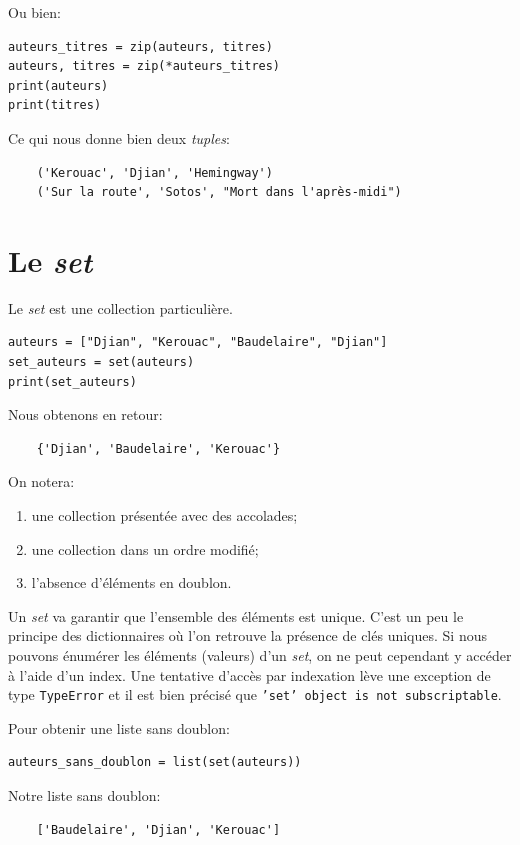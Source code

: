 \documentclass[a4paper,12pt]{book}
\begin{document}
Ou bien:
\begin{lstlisting}
auteurs_titres = zip(auteurs, titres)
auteurs, titres = zip(*auteurs_titres)
print(auteurs)
print(titres)
\end{lstlisting}
\medskip

Ce qui nous donne bien deux \textit{tuples}:
\begin{verbatim}
    ('Kerouac', 'Djian', 'Hemingway')
    ('Sur la route', 'Sotos', "Mort dans l'après-midi")
\end{verbatim}
\medskip

\section{Le \textit{set}}
Le \textit{set} est une collection particulière.
\begin{lstlisting}
auteurs = ["Djian", "Kerouac", "Baudelaire", "Djian"]
set_auteurs = set(auteurs)
print(set_auteurs)
\end{lstlisting}
\medskip

Nous obtenons en retour:
\begin{verbatim}
    {'Djian', 'Baudelaire', 'Kerouac'}
\end{verbatim}
\medskip

On notera:
\begin{enumerate}
	\item une collection présentée avec des accolades;
	\item une collection dans un ordre modifié;
	\item l'absence d'éléments en doublon.
\end{enumerate} 
\medskip

Un \textit{set} va garantir que l'ensemble des éléments est unique. C'est un peu le principe des dictionnaires où l'on retrouve la présence de clés uniques. Si nous pouvons énumérer les éléments (valeurs) d'un \textit{set}, on ne peut cependant y accéder à l'aide d'un index. Une tentative d'accès par indexation lève une exception de type \texttt{TypeError} et il est bien précisé que \texttt{'set' object is not subscriptable}.
\medskip

Pour obtenir une liste sans doublon:
\begin{lstlisting}
auteurs_sans_doublon = list(set(auteurs))
\end{lstlisting}
\medskip

Notre liste sans doublon:
\begin{verbatim}
    ['Baudelaire', 'Djian', 'Kerouac']
\end{verbatim}
\medskip
\end{document}
